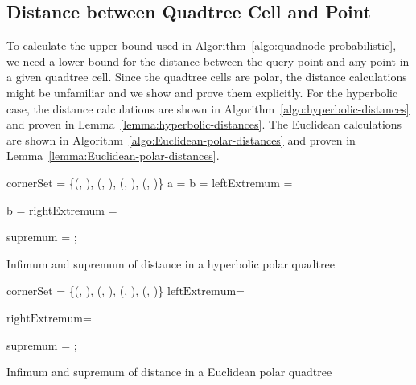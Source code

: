 \documentclass{llncs}
\begin{document}
\newcommand{\lE}{\ensuremath{\mathrm{leftExtremum}}}
\newcommand{\rE}{\ensuremath{\mathrm{rightExtremum}}}



\subsection{Distance between Quadtree Cell and Point}
\label{sec:distance}
To calculate the upper bound  used in Algorithm~\ref{algo:quadnode-probabilistic}, we need a lower bound for the distance between the query point  and any point in a given quadtree cell.
Since the quadtree cells are polar, the distance calculations might be unfamiliar and we show and prove them explicitly.
For the hyperbolic case, the distance calculations are shown in Algorithm~\ref{algo:hyperbolic-distances} and proven in Lemma~\ref{lemma:hyperbolic-distances}.
The Euclidean calculations are shown in Algorithm~\ref{algo:Euclidean-polar-distances} and proven in Lemma~\ref{lemma:Euclidean-polar-distances}.

\LinesNumbered
\begin{algorithm}
cornerSet = \{(, ), (, ), (, ), (, )\}\;
a = \;
b = \;
leftExtremum = \label{line:left-extremum}\;

b = \;
rightExtremum = \label{line:right-extremum}\;

\;

supremum = \;
;

 \caption{Infimum and supremum of distance in a hyperbolic polar quadtree}
 \label{algo:hyperbolic-distances}
\end{algorithm}


\begin{algorithm}
 cornerSet = \{(, ), (, ), (, ), (, )\}\;
\lE = \;\label{line:left-extremum-Euclidean}

\rE = \;\label{line:right-extremum-Euclidean}

\;

supremum = \;
;
 \caption{Infimum and supremum of distance in a Euclidean polar quadtree}
 \label{algo:Euclidean-polar-distances}
\end{algorithm}
\end{document}
